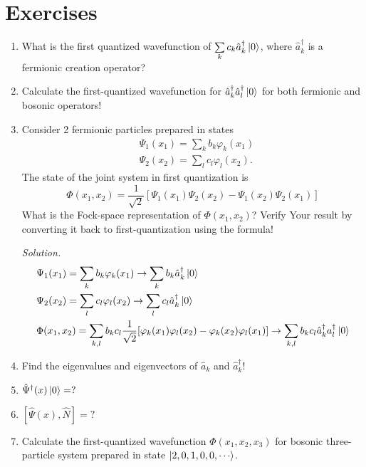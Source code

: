 \documentclass[11pt, a4paper]{article}
\begin{document}
\section{Exercises}
\begin{enumerate}
    \item What is the first quantized wavefunction of $\sum\limits_k c_k \hat a_k^{\dagger}\ket 0$, where
    $\hat a_k^{\dagger}$ is a fermionic creation operator?
    \item Calculate the first-quantized wavefunction for $\hat a_k^{\dagger}\hat a_l^{\dagger}\ket 0$ for
    both fermionic and bosonic operators!
    \item Consider 2 fermionic particles prepared in states
    \begin{align*}
        &\Psi_1(x_1) = \sum\limits_k b_k\varphi_k(x_1)\\
        &\Psi_2(x_2) = \sum\limits_l c_l\varphi_l(x_2).
    \end{align*}
    The state of the joint system in first quantization is 
    \begin{equation*}
        \Phi(x_1, x_2) = \frac{1}{\sqrt 2}[\Psi_1(x_1)\Psi_2(x_2) - \Psi_1(x_2)\Psi_2(x_1)]
    \end{equation*}
    What is the Fock-space representation of $\Phi(x_1, x_2)$? Verify Your result by converting it back to 
    first-quantization using the formula!
    \par \textit{Solution.} 
    \begin{align*}
        &\Psi_1(x_1) = \sum\limits_k b_k\varphi_k(x_1) \rightarrow \sum\limits_k b_k \hat a_k^{\dagger}\ket{0} \\
        &\Psi_2(x_2) = \sum\limits_l c_l\varphi_l(x_2) \rightarrow \sum\limits_l c_l \hat a_k^{\dagger}\ket{0} \\
        &\Phi(x_1, x_2) = \sum\limits_{k,l} b_kc_l \frac{1}{\sqrt 2} [\varphi_k(x_1)\varphi_l(x_2) - \varphi_k(x_2)\varphi_l(x_1)]
        \rightarrow \sum\limits_{k,l} b_kc_l \hat a_k^{\dagger}a_l^{\dagger} \ket 0 
    \end{align*}
    \item Find the eigenvalues and eigenvectors of $\hat a_k$ and $\hat a_k^{\dagger}$!
    \item $\hat\Psi^{\dagger}(x)\ket 0 = ?$
    \item $[\hat \Psi(x), \hat N] = ?$
    \item Calculate the first-quantized wavefunction $\Phi(x_1,x_2,x_3)$ for bosonic three-particle system 
    prepared in state $\ket{2, 0, 1, 0, 0, \cdots}$.

\end{enumerate}
\end{document}
